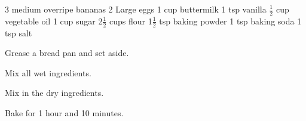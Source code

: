 \dishtype{\vegetarian, \bread}
\begin{ingreds}
    3 medium overripe bananas
    2 Large eggs
    1 cup buttermilk
    1 tsp vanilla
    $\frac{1}{2}$ cup vegetable oil
    1 cup sugar
    2$\frac{1}{2}$ cups flour
    1$\frac{1}{2}$ tsp baking powder
    1 tsp baking soda
    1 tsp salt  
\end{ingreds}
\begin{method}
    Grease a bread pan and set aside.\par
    Mix all wet ingredients.\par
    Mix in the dry ingredients.\par
    Bake for 1 hour and 10 minutes.
\end{method}